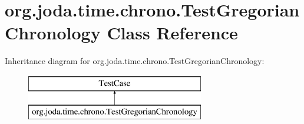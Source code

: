 \hypertarget{classorg_1_1joda_1_1time_1_1chrono_1_1_test_gregorian_chronology}{\section{org.\-joda.\-time.\-chrono.\-Test\-Gregorian\-Chronology Class Reference}
\label{classorg_1_1joda_1_1time_1_1chrono_1_1_test_gregorian_chronology}
}
Inheritance diagram for org.\-joda.\-time.\-chrono.\-Test\-Gregorian\-Chronology\-:\begin{figure}[H]
\begin{center}
\leavevmode
\includegraphics[height=2.000000cm]{classorg_1_1joda_1_1time_1_1chrono_1_1_test_gregorian_chronology}
\end{center}
\end{figure}
